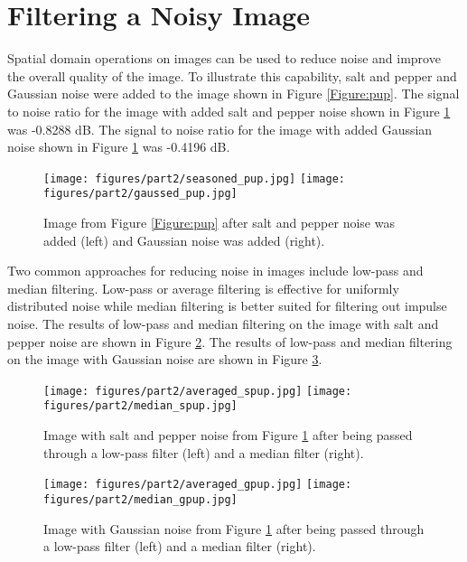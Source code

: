 \documentclass{article}
\begin{document}

\section{Filtering a Noisy Image}
Spatial domain operations on images can be used to reduce noise and improve the overall quality of the image. To illustrate this capability, salt and pepper and Gaussian noise were added to the image shown in Figure \ref{Figure:pup}. The signal to noise ratio for the image with added salt and pepper noise shown in Figure \ref{Figure:noisepup} was -0.8288 dB. The signal to noise ratio for the image with added Gaussian noise shown in Figure \ref{Figure:noisepup} was -0.4196 dB.

\begin{figure}[!ht]
  \centering
  \texttt{[image: figures/part2/seasoned\_pup.jpg]}  \texttt{[image: figures/part2/gaussed\_pup.jpg]}
  \caption{Image from Figure \ref{Figure:pup} after salt and pepper noise was added (left) and Gaussian noise was added (right). }
  \label{Figure:noisepup}
\end{figure}

Two common approaches for reducing noise in images include low-pass and median filtering. Low-pass or average filtering is effective for uniformly distributed noise while median filtering is better suited for filtering out impulse noise. The results of low-pass and median filtering on the image with salt and pepper noise are shown in Figure \ref{Figure:unseasonedpup}. The results of low-pass and median filtering on the image with Gaussian noise are shown in Figure \ref{Figure:degaussedpup}.

\begin{figure}[!ht]
  \centering
  \texttt{[image: figures/part2/averaged\_spup.jpg]}
  \texttt{[image: figures/part2/median\_spup.jpg]}
  \caption{Image with salt and pepper noise from Figure \ref{Figure:noisepup} after being passed through a low-pass filter (left) and a median filter (right). }
  \label{Figure:unseasonedpup}
\end{figure}

\begin{figure}[!ht]
  \centering
  \texttt{[image: figures/part2/averaged\_gpup.jpg]}
  \texttt{[image: figures/part2/median\_gpup.jpg]}
  \caption{Image with Gaussian noise from Figure \ref{Figure:noisepup} after being passed through a low-pass filter (left) and a median filter (right). }
  \label{Figure:degaussedpup}
\end{figure}
\end{document}
